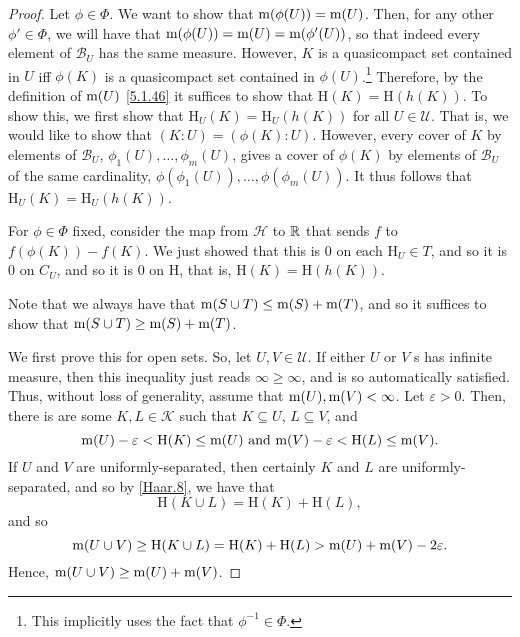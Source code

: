 \begin{thm}
\begin{savenotes}
\begin{proof}
Let $\phi \in \Phi$.  We want to show that $\mathrm{m} (\phi (U))=\mathrm{m} (U)$.  Then, for any other $\phi '\in \Phi$, we will have that $\mathrm{m} (\phi (U))=\mathrm{m} (U)=\mathrm{m} (\phi '(U))$, so that indeed every element of $\mathcal{B}_U$ has the same measure.  However, $K$ is a quasicompact set contained in $U$ iff $\phi (K)$ is a quasicompact set contained in $\phi (U)$.\footnote{This implicitly uses the fact that $\phi ^{-1}\in \Phi$.}  Therefore, by the definition of $\mathrm{m} (U)$ \eqref{5.1.46} it suffices to show that $\mathrm{H}(K)=\mathrm{H}(h(K))$.  To show this, we first show that $\mathrm{H}_U(K)=\mathrm{H}_U(h(K))$ for all $U\in \mathcal{U}$.  That is, we would like to show that $(K:U)=(\phi (K):U)$.  However, every cover of $K$ by elements of $\mathcal{B}_U$, $\phi _1(U),\ldots ,\phi _m(U)$, gives a cover of $\phi (K)$ by elements of $\mathcal{B}_U$ of the same cardinality, $\phi (\phi _1(U)),\ldots ,\phi (\phi _m(U))$.  It thus follows that $\mathrm{H}_U(K)=\mathrm{H}_U(h(K))$.

For $\phi \in \Phi$ fixed, consider the map from $\mathcal{H}$ to $\mathbb{R}$ that sends $f$ to $f(\phi (K))-f(K)$.  We just showed that this is $0$ on each $\mathrm{H}_U\in T$, and so it is $0$ on $C_U$, and so it is $0$ on $\mathrm{H}$, that is, $\mathrm{H}(K)=\mathrm{H}(h(K))$.

Note that we always have that $\mathrm{m} (S\cup T)\leq \mathrm{m} (S)+\mathrm{m} (T)$, and so it suffices to show that $\mathrm{m} (S\cup T)\geq \mathrm{m} (S)+\mathrm{m} (T)$.

We first prove this for open sets.  So, let $U,V\in \mathcal{U}$.  If either $U$ or $V$ s has infinite measure, then this inequality just reads $\infty \geq \infty$, and is so automatically satisfied.  Thus, without loss of generality, assume that $\mathrm{m} (U),\mathrm{m} (V)<\infty$.  Let $\varepsilon >0$.  Then, there is are some $K,L\in \mathcal{K}$ such that $K\subseteq U$, $L\subseteq V$, and
\begin{equation}
\mathrm{m} (U)-\varepsilon <\mathrm{H}(K)\leq \mathrm{m} (U)\text{ and }\mathrm{m} (V)-\varepsilon <\mathrm{H}(L)\leq \mathrm{m} (V).
\end{equation}
If $U$ and $V$ are uniformly-separated, then certainly $K$ and $L$ are uniformly-separated, and so by \cref{Haar.8}, we have that
\begin{equation}
\mathrm{H}(K\cup L)=\mathrm{H}(K)+\mathrm{H}(L),
\end{equation}
and so
\begin{equation}
\mathrm{m} (U\cup V)\geq \mathrm{H}(K\cup L)=\mathrm{H}(K)+\mathrm{H}(L)>\mathrm{m} (U)+\mathrm{m} (V)-2\varepsilon .
\end{equation}
Hence, $\mathrm{m} (U\cup V)\geq \mathrm{m} (U)+\mathrm{m} (V)$.


\end{proof}
\end{savenotes}
\end{thm}
